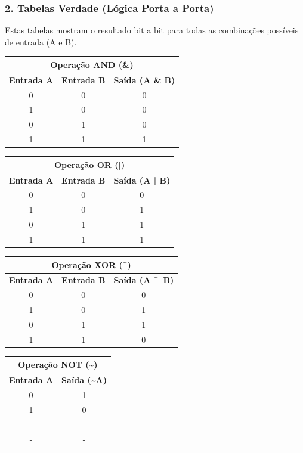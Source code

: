 \documentclass[12pt,a4paper]{article}
\begin{document}
\subsubsection*{2. Tabelas Verdade (Lógica Porta a Porta)}
Estas tabelas mostram o resultado bit a bit para todas as combinações possíveis de entrada (A e B).

\begin{table}[H]
    \centering
    \begin{tabular}{cc|c}
    \multicolumn{3}{c}{\textbf{Operação AND (\&)}} \\
    \toprule
    \textbf{Entrada A} & \textbf{Entrada B} & \textbf{Saída (A \& B)} \\
    \midrule
    0 & 0 & 0 \\
    1 & 0 & 0 \\
    0 & 1 & 0 \\
    1 & 1 & 1 \\
    \bottomrule
    \end{tabular}
    \quad
    \begin{tabular}{cc|c}
    \multicolumn{3}{c}{\textbf{Operação OR (|)}} \\
    \toprule
    \textbf{Entrada A} & \textbf{Entrada B} & \textbf{Saída (A | B)} \\
    \midrule
    0 & 0 & 0 \\
    1 & 0 & 1 \\
    0 & 1 & 1 \\
    1 & 1 & 1 \\
    \bottomrule
    \end{tabular}
\end{table}

\begin{table}[H]
    \centering
    \begin{tabular}{cc|c}
    \multicolumn{3}{c}{\textbf{Operação XOR (\textasciicircum)}} \\
    \toprule
    \textbf{Entrada A} & \textbf{Entrada B} & \textbf{Saída (A \textasciicircum\ B)} \\
    \midrule
    0 & 0 & 0 \\
    1 & 0 & 1 \\
    0 & 1 & 1 \\
    1 & 1 & 0 \\
    \bottomrule
    \end{tabular}
    \quad
    \begin{tabular}{c|c}
    \multicolumn{2}{c}{\textbf{Operação NOT (\textasciitilde)}} \\
    \toprule
    \textbf{Entrada A} & \textbf{Saída (\textasciitilde A)} \\
    \midrule
    0 & 1 \\
    1 & 0 \\
    - & - \\
    - & - \\
    \bottomrule
    \end{tabular}
\end{table}
\end{document}
